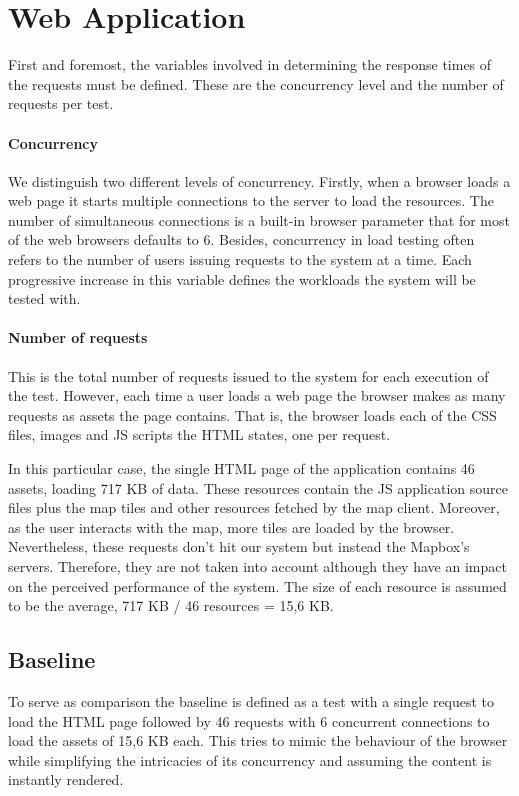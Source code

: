\section{Web Application}

First and foremost, the variables involved in determining the response times of the requests must be defined. These are the concurrency level and the number of requests per test.

\paragraph{Concurrency} We distinguish two different levels of concurrency. Firstly, when a browser loads a web page it starts multiple connections to the server to load the resources. The number of simultaneous connections is a built-in browser parameter that for most of the web browsers defaults to 6. Besides, concurrency in load testing often refers to the number of users issuing requests to the system at a time. Each progressive increase in this variable defines the workloads the system will be tested with.

\paragraph{Number of requests} This is the total number of requests issued to the system for each execution of the test. However, each time a user loads a web page the browser makes as many requests as assets the page contains. That is, the browser loads each of the CSS files, images and JS scripts the HTML states, one per request.

In this particular case, the single HTML page of the application contains 46 assets, loading 717 KB of data. These resources contain the JS application source files plus the map tiles and other resources fetched by the map client. Moreover, as the user interacts with the map, more tiles are loaded by the browser. Nevertheless, these requests don't hit our system but instead the Mapbox's servers. Therefore, they are not taken into account although they have an impact on the perceived performance of the system. The size of each resource is assumed to be the average, 717 KB / 46 resources = 15,6 KB.

\subsection*{Baseline}

To serve as comparison the baseline is defined as a test with a single request to load the HTML page followed by 46 requests with 6 concurrent connections to load the assets of 15,6 KB each. This tries to mimic the behaviour  of the browser while simplifying the intricacies of its concurrency and assuming the content is instantly rendered.

